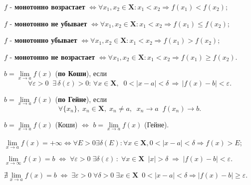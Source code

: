 \documentclass[10pt]{article}
\begin{document}
\begin{definition}
$f$ - \textbf{монотонно возрастает} $\Leftrightarrow \forall x_1, x_2\!\in\!\textbf{X}: x_1\!<\!x_2 \Rightarrow f(x_1)\!<\!f(x_2)$;

\medskip

$f$ - \textbf{монотонно не убывает} $\Leftrightarrow \forall x_1, x_2 \in \textbf{X}: x_1<x_2 \Rightarrow f(x_1)\leqslant f(x_2)$;
\medskip

$f$ - \textbf{монотонно убывает} $\Leftrightarrow \forall x_1, x_2 \in \textbf{X}: x_1<x_2 \Rightarrow f(x_1)> f(x_2)$;

\medskip

$f$ - \textbf{монотонно не возрастает} $\Leftrightarrow \forall x_1, x_2 \in \textbf{X}: x_1<x_2 \Rightarrow f(x_1)\geqslant f(x_2)$.
\end{definition}

\begin{definition} $b=\lim\limits_{x\rightarrow a} f(x)$ (\textbf{по Коши}), если
$$\forall \varepsilon > 0 \;\; \exists \, \delta(\varepsilon)>0 : \, \forall x \in \textbf{X}, \;\; 0<|x-a|<\delta \, \Rightarrow \, |f(x) - b| < \varepsilon.$$
\end{definition}

\begin{definition} $b=\lim\limits_{x\rightarrow a} f(x)$ (\textbf{по Гейне}), если
$$\forall \{x_n\}, \; x_n \in \textbf{X}, \; x_n \neq a, \;\; x_n \rightarrow a \;\; f(x_n) \rightarrow b.$$
\end{definition}

\begin{proposition}
$b=\lim\limits_{x\rightarrow a} f(x)$ (Коши)  $\Longleftrightarrow$ $b=\lim\limits_{x\rightarrow a} f(x)$ (Гейне).
\end{proposition}

\begin{definition}
$\lim\limits_{x\rightarrow a} f(x)=+\infty \!\Leftrightarrow\! \forall E>0 \exists \delta(E): \forall x\!\in\!\textbf{X}, 0\!<\!|x-a|\!<\!\delta \Rightarrow f(x)\!>\!E$;
\medskip

$\lim\limits_{x\rightarrow \infty} f(x)=b \; \Leftrightarrow \; \forall \varepsilon > 0 \; \exists \delta(\varepsilon) \, : \; \forall x \in \textbf{X} \,\,\, |x|>\delta \; \Rightarrow \; |f(x)-b|<\varepsilon.$
\medskip

$\nexists\lim\limits_{x\rightarrow a} f(x)=b \; \Leftrightarrow \; \exists \varepsilon > 0 \; \forall \delta > 0 \; \exists x \in \textbf{X} \,\,\, 0<|x-a|<\delta \Rightarrow |f(x)-b|\geqslant \varepsilon.$
\end{definition}
\end{document}
